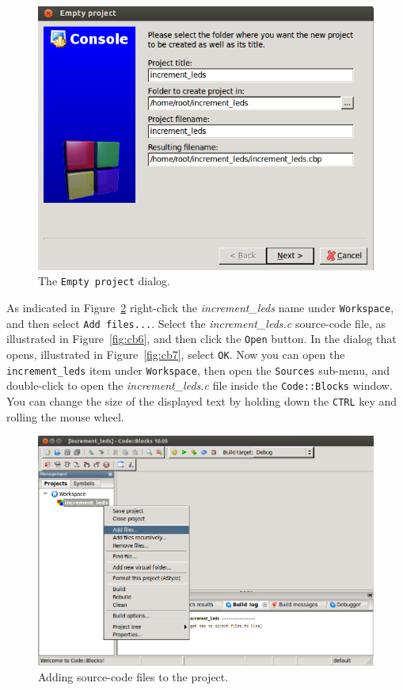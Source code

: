 \documentclass[11pt, twoside, pdftex]{article}
\begin{document}
\begin{figure} [h]
\begin{center}
\includegraphics[scale = .60]{figures/cb3.png}
\end{center}
\caption{The \texttt{Empty project} dialog.}
\label{fig:cb3}
\end{figure}

As indicated in Figure~\ref{fig:cb5} right-click the {\it increment\_leds} name under
\texttt{Workspace}, and then select \texttt{Add files...}. Select the {\it
increment\_leds.c} source-code file, as illustrated in Figure~\ref{fig:cb6}, and then 
click the \texttt{Open} button. In the dialog that opens, illustrated in
Figure~\ref{fig:cb7}, select \texttt{OK}. Now you can open the \texttt{increment\_leds} item
under \texttt{Workspace}, then open the \texttt{Sources} sub-menu, and double-click to open 
the {\it increment\_leds.c} file inside the \texttt{Code::Blocks} window. You can change
the size of the displayed text by holding down the \texttt{CTRL} key and rolling the mouse
wheel.

\begin{figure} [h]
\begin{center}
\includegraphics[scale = .60]{figures/cb5.png}
\end{center}
\caption{Adding source-code files to the project.}
\label{fig:cb5}
\end{figure}
\end{document}
